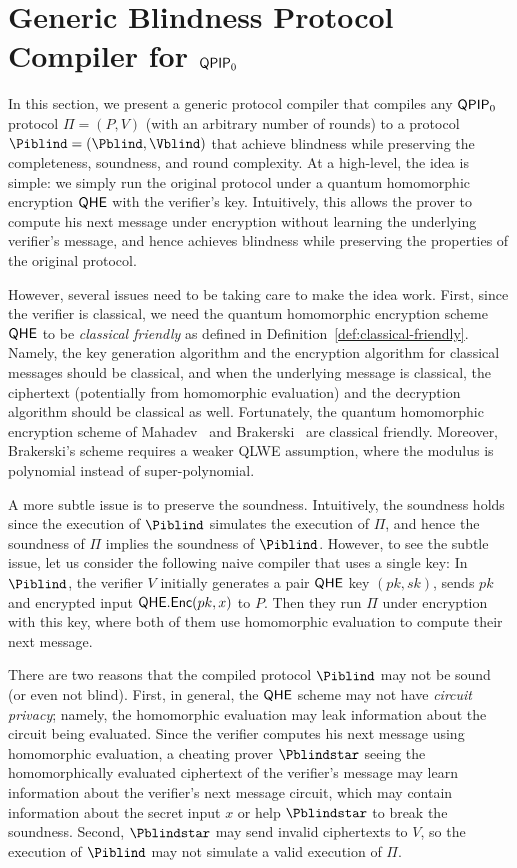 \section{Generic Blindness Protocol Compiler for $\operatorname{\mathsf{QPIP}}_0$}
\label{sec:BlindBQP2}

In this section, we present a generic protocol compiler that compiles any $\operatorname{\mathsf{QPIP}}_0$ protocol $\Pi = (P, V)$ (with an arbitrary number of rounds) to a protocol $\Piblind = (\Pblind, \Vblind)$ that achieve blindness while preserving the completeness, soundness, and round complexity. At a high-level, the idea is simple: we simply run the original protocol under a quantum homomorphic encryption $\mathsf{QHE}$ with the verifier's key. Intuitively, this allows the prover to compute his next message under encryption without learning the underlying verifier's message, and hence achieves blindness while preserving the properties of the original protocol.

However, several issues need to be taking care to make the idea work. First, since the verifier is classical, we need the quantum homomorphic encryption scheme $\mathsf{QHE}$ to be \emph{classical friendly} as defined in Definition~\ref{def:classical-friendly}. Namely, the key generation algorithm and the encryption algorithm for classical messages should be classical, and when the underlying message is classical, the ciphertext (potentially from homomorphic evaluation) and the decryption algorithm should be classical as well. Fortunately, the quantum homomorphic encryption scheme of Mahadev~\cite{mahadev_qfhe} and Brakerski~\cite{brakerski_qfhe} are classical friendly. Moreover, Brakerski's scheme requires a weaker QLWE assumption, where the modulus is polynomial instead of super-polynomial.

A more subtle issue is to preserve the soundness. Intuitively, the soundness holds since the execution of $\Piblind$ simulates the execution of $\Pi$, and hence the soundness of $\Pi$ implies the soundness of $\Piblind$. However, to see the subtle issue, let us consider the following naive compiler that uses a single key: In $\Piblind$,  the verifier $V$ initially generates a pair $\mathsf{QHE}$ key $(pk, sk)$, sends $pk$ and encrypted input $\mathsf{QHE.Enc}(pk,x)$ to $P$. Then they run $\Pi$ under encryption with this key, where both of them use homomorphic evaluation to compute their next message.

There are two reasons that the compiled protocol $\Piblind$ may not be sound (or even not blind). First, in general, the $\mathsf{QHE}$ scheme may not have \emph{circuit privacy}; namely, the homomorphic evaluation may leak information about the circuit being evaluated. Since the verifier computes his next message using homomorphic evaluation, a cheating prover $\Pblindstar$ seeing the homomorphically evaluated ciphertext of the verifier's message may learn information about the verifier's next message circuit, which may contain information about the secret input $x$ or help $\Pblindstar$ to break the soundness. Second, $\Pblindstar$ may send invalid ciphertexts to $V$, so the execution of $\Piblind$ may not simulate a valid execution of $\Pi$.

